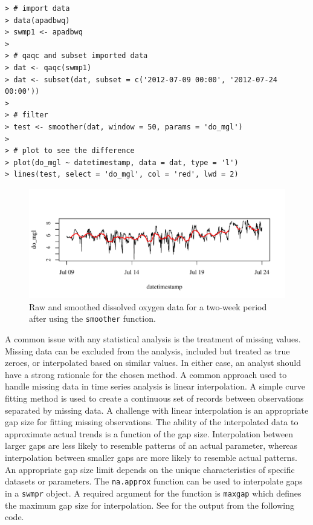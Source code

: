 \documentclass[10pt,letterpaper]{article}\usepackage[]{graphicx}\usepackage[]{color}
\makeatletter
\def\maxwidth{ %
  \ifdim\Gin@nat@width>\linewidth
    \linewidth
  \else
    \Gin@nat@width
  \fi
}
\newenvironment{kframe}{%
 \def\at@end@of@kframe{}%
 \ifinner\ifhmode%
  \def\at@end@of@kframe{\end{minipage}}%
  \begin{minipage}{\columnwidth}%
 \fi\fi%
 \def\FrameCommand##1{\hskip\@totalleftmargin \hskip-\fboxsep
 \colorbox{shadecolor}{##1}\hskip-\fboxsep
     \hskip-\linewidth \hskip-\@totalleftmargin \hskip\columnwidth}%
 \MakeFramed {\advance\hsize-\width
   \@totalleftmargin\z@ \linewidth\hsize
   \@setminipage}}%
 {\par\unskip\endMakeFramed%
 \at@end@of@kframe}
\newenvironment{knitrout}{}{} %
\makeatother
\begin{document}
\begin{knitrout}
\color{fgcolor}\begin{kframe}
\begin{verbatim}
> # import data
> data(apadbwq)
> swmp1 <- apadbwq
> 
> # qaqc and subset imported data
> dat <- qaqc(swmp1)
> dat <- subset(dat, subset = c('2012-07-09 00:00', '2012-07-24 00:00'))
> 
> # filter
> test <- smoother(dat, window = 50, params = 'do_mgl')
> 
> # plot to see the difference
> plot(do_mgl ~ datetimestamp, data = dat, type = 'l')
> lines(test, select = 'do_mgl', col = 'red', lwd = 2)
\end{verbatim}
\end{kframe}\begin{figure}[!ht]


{\centering \includegraphics[width=\maxwidth]{figure/smooth_ex} 

}

\caption[Raw and smoothed dissolved oxygen data for a two-week period after using the \texttt{smoother} function]{Raw and smoothed dissolved oxygen data for a two-week period after using the \texttt{smoother} function.\label{fig:smooth_ex}}
\end{figure}


\end{knitrout}

A common issue with any statistical analysis is the treatment of missing values.  Missing data can be excluded from the analysis, included but treated as true zeroes, or interpolated based on similar values.  In either case, an analyst should have a strong rationale for the chosen method.  A common approach used to handle missing data in time series analysis is linear interpolation.  A simple curve fitting method is used to create a continuous set of records between observations separated by missing data.  A challenge with linear interpolation is an appropriate gap size for fitting missing observations.  The ability of the interpolated data to approximate actual trends is a function of the gap size.  Interpolation between larger gaps are less likely to resemble patterns of an actual parameter, whereas interpolation between smaller gaps are more likely to resemble actual patterns.  An appropriate gap size limit depends on the unique characteristics of specific datasets or parameters.  The \texttt{na.approx} function can be used to interpolate gaps in a \texttt{swmpr} object.  A required argument for the function is \texttt{maxgap} which defines the maximum gap size for interpolation.  See  for the output from the following code.
\end{document}
